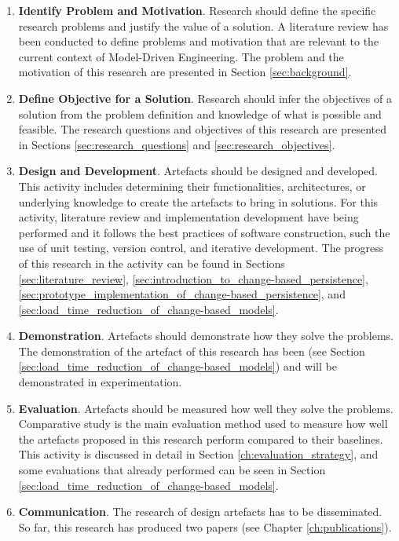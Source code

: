 \documentclass[12pt, a4paper]{report} \usepackage[titletoc]{appendix}
\begin{document}
\begin{enumerate}
    \item \textbf{Identify Problem and Motivation}. Research should define the specific research problems and justify the value of a solution. A literature review has been conducted to define problems and motivation that are relevant to the current context of Model-Driven Engineering. The problem and the motivation of this research are presented in Section \ref{sec:background}.   
    \item \textbf{Define Objective for a Solution}. Research should infer the objectives of a solution from the problem definition and knowledge of what is possible and feasible. The research questions and objectives of this research are presented in Sections \ref{sec:research_questions} and \ref{sec:research_objectives}.
    \item \textbf{Design and Development}. Artefacts should be designed and developed. This activity includes determining their functionalities, architectures, or underlying knowledge to create the artefacts to bring in solutions. For this activity, literature review and implementation development have being performed and it follows the best practices of software construction, such the use of unit testing, version control, and iterative development. The progress of this research in the activity can be found in Sections \ref{sec:literature_review}, \ref{sec:introduction_to_change-based_persistence}, \ref{sec:prototype_implementation_of_change-based_persistence}, and \ref{sec:load_time_reduction_of_change-based_models}. 
    \item \textbf{Demonstration}. Artefacts should demonstrate how they solve the problems. The demonstration of the artefact of this research has been (see Section \ref{sec:load_time_reduction_of_change-based_models}) and will be demonstrated in experimentation. 
    \item \textbf{Evaluation}. Artefacts should be measured how well they solve the problems. Comparative study is the main evaluation method used to measure how well the artefacts proposed in this research perform compared to their baselines. This activity is discussed in detail in Section \ref{ch:evaluation_strategy}, and some evaluations that already performed can be seen in Section \ref{sec:load_time_reduction_of_change-based_models}.
    \item \textbf{Communication}. The research of design artefacts has to be disseminated. So far, this research has produced two papers (see Chapter \ref{ch:publications}). 
\end{enumerate}
\end{document}
